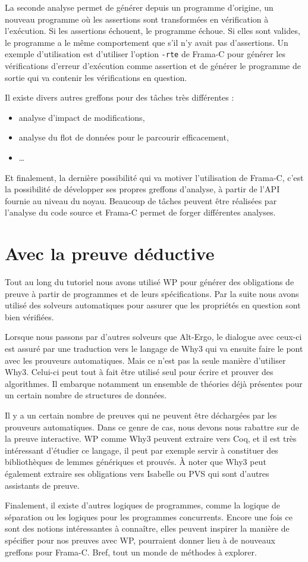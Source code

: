 \documentclass[12pt,francais,]{scrbook}
\providecommand{\tightlist}{%
  \setlength{\itemsep}{0pt}\setlength{\parskip}{0pt}}
\begin{document}
La seconde analyse permet de générer depuis un programme d'origine, un
nouveau programme où les assertions sont transformées en vérification à
l'exécution. Si les assertions échouent, le programme échoue. Si elles
sont valides, le programme a le même comportement que s'il n'y avait pas
d'assertions. Un exemple d'utilisation est d'utiliser l'option
\texttt{-rte} de Frama-C pour générer les vérifications d'erreur
d'exécution comme assertion et de générer le programme de sortie qui va
contenir les vérifications en question.

Il existe divers autres greffons pour des tâches très différentes :

\begin{itemize}
\tightlist
\item
  analyse d'impact de modifications,
\item
  analyse du flot de données pour le parcourir efficacement,
\item
  \ldots{}
\end{itemize}

Et finalement, la dernière possibilité qui va motiver l'utilisation de
Frama-C, c'est la possibilité de développer ses propres greffons
d'analyse, à partir de l'API fournie au niveau du noyau. Beaucoup de
tâches peuvent être réalisées par l'analyse du code source et Frama-C
permet de forger différentes analyses.

\section{Avec la preuve déductive}\label{avec-la-preuve-duxe9ductive}

Tout au long du tutoriel nous avons utilisé WP pour générer des
obligations de preuve à partir de programmes et de leurs spécifications.
Par la suite nous avons utilisé des solveurs automatiques pour assurer
que les propriétés en question sont bien vérifiées.

Lorsque nous passons par d'autres solveurs que Alt-Ergo, le dialogue
avec ceux-ci est assuré par une traduction vers le langage de Why3 qui
va ensuite faire le pont avec les prouveurs automatiques. Mais ce n'est
pas la seule manière d'utiliser Why3. Celui-ci peut tout à fait être
utilisé seul pour écrire et prouver des algorithmes. Il embarque
notamment un ensemble de théories déjà présentes pour un certain nombre
de structures de données.

Il y a un certain nombre de preuves qui ne peuvent être déchargées par
les prouveurs automatiques. Dans ce genre de cas, nous devons nous
rabattre sur de la preuve interactive. WP comme Why3 peuvent extraire
vers Coq, et il est très intéressant d'étudier ce langage, il peut par
exemple servir à constituer des bibliothèques de lemmes génériques et
prouvés. À noter que Why3 peut également extraire ses obligations vers
Isabelle ou PVS qui sont d'autres assistants de preuve.

Finalement, il existe d'autres logiques de programmes, comme la logique
de séparation ou les logiques pour les programmes concurrents. Encore
une fois ce sont des notions intéressantes à connaître, elles peuvent
inspirer la manière de spécifier pour nos preuves avec WP, pourraient
donner lieu à de nouveaux greffons pour Frama-C. Bref, tout un monde de
méthodes à explorer.
\end{document}

